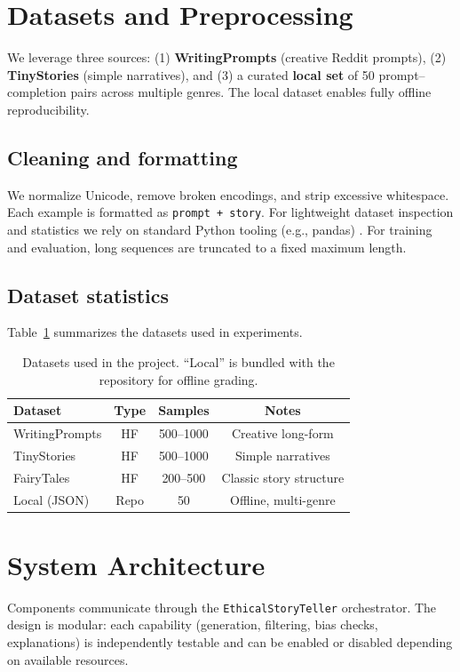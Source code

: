 \documentclass[conference]{IEEEtran}
\begin{document}
\section{Datasets and Preprocessing}
We leverage three sources: (1) \textbf{WritingPrompts} (creative Reddit prompts), (2) \textbf{TinyStories} (simple narratives), and (3) a curated \textbf{local set} of 50 prompt--completion pairs across multiple genres. The local dataset enables fully offline reproducibility.

\subsection{Cleaning and formatting}
We normalize Unicode, remove broken encodings, and strip excessive whitespace. Each example is formatted as \texttt{prompt + story}. For lightweight dataset inspection and statistics we rely on standard Python tooling (e.g., pandas) \cite{mckinney2010pandas}. For training and evaluation, long sequences are truncated to a fixed maximum length.

\subsection{Dataset statistics}
Table~\ref{tab:data} summarizes the datasets used in experiments.

\begin{table}[t]
    \centering
    \caption{Datasets used in the project. ``Local'' is bundled with the repository for offline grading.}
    \label{tab:data}
    \begin{tabular}{lccc}
        \toprule
        Dataset & Type & Samples & Notes \\
        \midrule
        WritingPrompts & HF & 500--1000 & Creative long-form \\
        TinyStories & HF & 500--1000 & Simple narratives \\
        FairyTales & HF & 200--500 & Classic story structure \\
        Local (JSON) & Repo & 50 & Offline, multi-genre \\
        \bottomrule
    \end{tabular}
\end{table}

\section{System Architecture}
Components communicate through the \texttt{EthicalStoryTeller} orchestrator. The design is modular: each capability (generation, filtering, bias checks, explanations) is independently testable and can be enabled or disabled depending on available resources.
\end{document}

